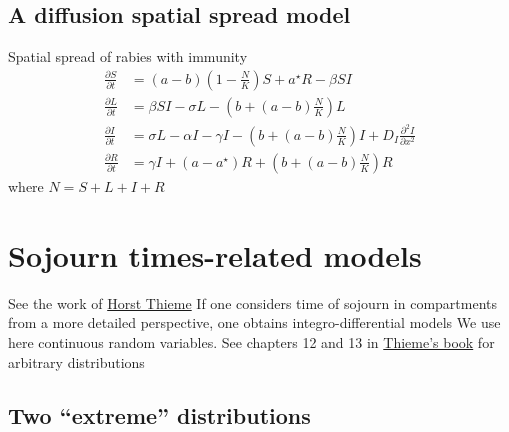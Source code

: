 \documentclass[aspectratio=169]{beamer}\usepackage[]{graphicx}\usepackage[]{xcolor}
\begin{document}
\subsection{A diffusion spatial spread model}


\begin{frame}{Spatial spread of rabies with immunity}
\begin{subequations}
\label{sys:rabies}
\begin{align}
\frac{\partial S}{\partial t} &= 
(a-b)\left(1-\frac NK\right)S+a^\star R-\beta SI \label{sys:rabies_S} \\
\frac{\partial L}{\partial t} &= 
\beta SI-\sigma L-\left(b+(a-b)\frac NK\right)L \label{sys:rabies_L} \\
\frac{\partial I}{\partial t} &= 
\sigma L-\alpha I-\gamma I-\left(b+(a-b)\frac NK\right)I 
+ D_I\frac{\partial^2 I}{\partial x^2} \label{sys:rabies_I} \\
\frac{\partial R}{\partial t} &= 
\gamma I+(a-a^\star)R+\left(b+(a-b)\frac NK\right)R \label{sys:rabies_R}
\end{align}
\end{subequations}
where $N=S+L+I+R$
\end{frame}

\section{Sojourn times-related models}

\begin{frame}
See the work of \href{https://scholar.google.ca/citations?user=o7R6ZHMAAAAJ}{Horst Thieme}
\vfill
If one considers time of sojourn in compartments from a more detailed perspective, one obtains integro-differential models
\vfill
We use here continuous random variables. See chapters 12 and 13 in \href{https://press.princeton.edu/books/paperback/9780691092911/mathematics-in-population-biology}{Thieme's book} for arbitrary distributions
\end{frame}

\subsection{Two ``extreme'' distributions}
\end{document}
